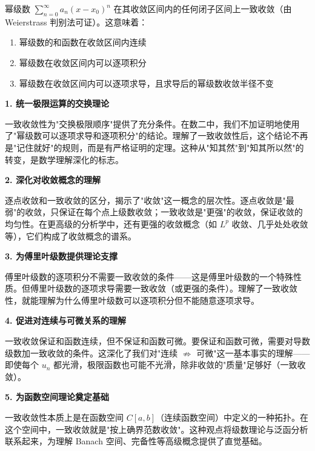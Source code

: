 幂级数 $\sum_{n=0}^\infty a_n(x-x_0)^n$ 在其收敛区间内的任何闭子区间上一致收敛（由 Weierstrass 判别法可证）。这意味着：

\begin{enumerate}[leftmargin=2em]
    \item 幂级数的和函数在收敛区间内连续
    \item 幂级数在收敛区间内可以逐项积分
    \item 幂级数在收敛区间内可以逐项求导，且求导后的幂级数收敛半径不变
\end{enumerate}

\begin{connectionbox}
\textbf{1. 统一极限运算的交换理论}

一致收敛性为"交换极限顺序"提供了充分条件。在数二中，我们不加证明地使用了"幂级数可以逐项求导和逐项积分"的结论。理解了一致收敛性后，这个结论不再是"记住就好"的规则，而是有严格证明的定理。这种从"知其然"到"知其所以然"的转变，是数学理解深化的标志。

\textbf{2. 深化对收敛概念的理解}

逐点收敛和一致收敛的区分，揭示了"收敛"这一概念的层次性。逐点收敛是"最弱"的收敛，只保证在每个点上级数收敛；一致收敛是"更强"的收敛，保证收敛的均匀性。在更高级的分析学中，还有更强的收敛概念（如 $L^p$ 收敛、几乎处处收敛等），它们构成了收敛概念的谱系。

\textbf{3. 为傅里叶级数提供理论支撑}

傅里叶级数的逐项积分不需要一致收敛的条件——这是傅里叶级数的一个特殊性质。但傅里叶级数的逐项求导需要一致收敛（或更强的条件）。理解了一致收敛性，就能理解为什么傅里叶级数可以逐项积分但不能随意逐项求导。

\textbf{4. 促进对连续与可微关系的理解}

一致收敛保证和函数连续，但不保证和函数可微。要保证和函数可微，需要对导数级数加一致收敛的条件。这深化了我们对"连续 $\not\Rightarrow$ 可微"这一基本事实的理解——即使每个 $u_n$ 都光滑，极限函数也可能不光滑，除非收敛的"质量"足够好（一致收敛）。

\textbf{5. 为函数空间理论奠定基础}

一致收敛性本质上是在函数空间 $C[a,b]$（连续函数空间）中定义的一种拓扑。在这个空间中，一致收敛就是"按上确界范数收敛"。这种观点将级数理论与泛函分析联系起来，为理解 Banach 空间、完备性等高级概念提供了直觉基础。
\end{connectionbox}
